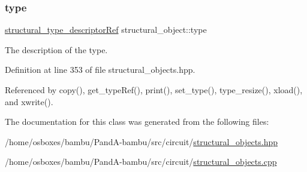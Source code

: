 \subsubsection{\texorpdfstring{type}{type}}
{\footnotesize\ttfamily \hyperlink{structural__objects_8hpp_a219296792577e3292783725961506c83}{structural\+\_\+type\+\_\+descriptor\+Ref} structural\+\_\+object\+::type\hspace{0.3cm}{\ttfamily [private]}}



The description of the type. 



Definition at line 353 of file structural\+\_\+objects.\+hpp.



Referenced by copy(), get\+\_\+type\+Ref(), print(), set\+\_\+type(), type\+\_\+resize(), xload(), and xwrite().



The documentation for this class was generated from the following files\+:\begin{DoxyCompactItemize}
\item 
/home/osboxes/bambu/\+Pand\+A-\/bambu/src/circuit/\hyperlink{structural__objects_8hpp}{structural\+\_\+objects.\+hpp}\item 
/home/osboxes/bambu/\+Pand\+A-\/bambu/src/circuit/\hyperlink{structural__objects_8cpp}{structural\+\_\+objects.\+cpp}\end{DoxyCompactItemize}

